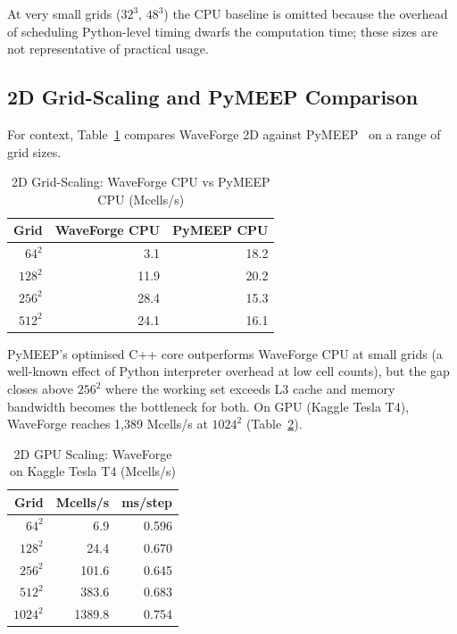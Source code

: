 \documentclass[10pt,twocolumn]{article}
\begin{document}
At very small grids ($32^3$, $48^3$) the CPU baseline is omitted because the
overhead of scheduling Python-level timing dwarfs the computation time;
these sizes are not representative of practical usage.

\subsection{2D Grid-Scaling and PyMEEP Comparison}

For context, Table~\ref{tab:2d_scaling} compares WaveForge 2D against
PyMEEP~\cite{oskooi2010meep} on a range of grid sizes.

\begin{table}[h]
\centering
\caption{2D Grid-Scaling: WaveForge CPU vs PyMEEP CPU (Mcells/s)}
\label{tab:2d_scaling}
\begin{tabular}{rrr}
\toprule
Grid & WaveForge CPU & PyMEEP CPU \\
\midrule
$64^2$   &  3.1 & 18.2 \\
$128^2$  & 11.9 & 20.2 \\
$256^2$  & 28.4 & 15.3 \\
$512^2$  & 24.1 & 16.1 \\
\bottomrule
\end{tabular}
\end{table}

PyMEEP's optimised C++ core outperforms WaveForge CPU at small grids (a
well-known effect of Python interpreter overhead at low cell counts), but the
gap closes above $256^2$ where the working set exceeds L3 cache and memory
bandwidth becomes the bottleneck for both. On GPU (Kaggle Tesla T4), WaveForge
reaches 1{,}389 Mcells/s at $1024^2$ (Table~\ref{tab:2d_gpu}).

\begin{table}[h]
\centering
\caption{2D GPU Scaling: WaveForge on Kaggle Tesla T4 (Mcells/s)}
\label{tab:2d_gpu}
\begin{tabular}{rrr}
\toprule
Grid & Mcells/s & ms/step \\
\midrule
$64^2$   &    6.9 & 0.596 \\
$128^2$  &   24.4 & 0.670 \\
$256^2$  &  101.6 & 0.645 \\
$512^2$  &  383.6 & 0.683 \\
$1024^2$ & 1389.8 & 0.754 \\
\bottomrule
\end{tabular}
\end{table}
\end{document}
